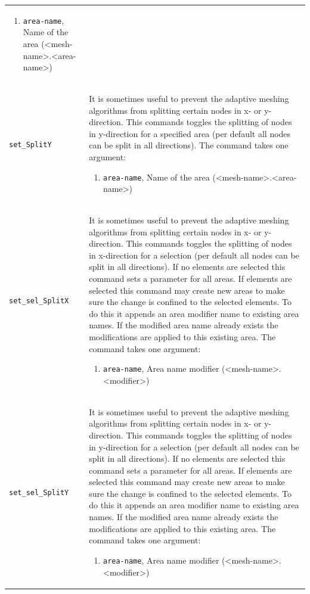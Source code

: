 \documentclass[noshowpacs,preprintnumbers,amsmath,amssymb, letter]{revtex4}
\begin{document}
\begin{longtable}{p{}p{}}
\begin{enumerate}
\item \texttt{area-name}, Name of the area (\textless mesh-name\textgreater .\textless area-name\textgreater )
\end{enumerate}\\
\texttt{set\_SplitY}	&  It is sometimes useful to prevent the adaptive meshing algorithms from splitting certain nodes in x- or y-direction. This commands toggles the splitting of nodes in y-direction for a specified area (per default all nodes can be split in all directions). The command takes one argument:
\begin{enumerate}
\item \texttt{area-name}, Name of the area (\textless mesh-name\textgreater .\textless area-name\textgreater )
\end{enumerate}\\
\texttt{set\_sel\_SplitX}	&  It is sometimes useful to prevent the adaptive meshing algorithms from splitting certain nodes in x- or y-direction. This commands toggles the splitting of nodes in x-direction for a selection (per default all nodes can be split in all directions). If no elements are selected this command sets a parameter for all areas. If elements are selected this command may create new areas to make sure the change is confined to the selected elements. To do this it appends an area modifier name to existing area names. If the modified area name already exists the modifications are applied to this existing area. The command takes one argument:
\begin{enumerate}
\item \texttt{area-name}, Area name modifier (\textless mesh-name\textgreater .\textless modifier\textgreater )
\end{enumerate}\\
\texttt{set\_sel\_SplitY}	&  It is sometimes useful to prevent the adaptive meshing algorithms from splitting certain nodes in x- or y-direction. This commands toggles the splitting of nodes in y-direction for a selection (per default all nodes can be split in all directions). If no elements are selected this command sets a parameter for all areas. If elements are selected this command may create new areas to make sure the change is confined to the selected elements. To do this it appends an area modifier name to existing area names. If the modified area name already exists the modifications are applied to this existing area. The command takes one argument:
\begin{enumerate}
\item \texttt{area-name}, Area name modifier (\textless mesh-name\textgreater .\textless modifier\textgreater )

\end{enumerate}
\end{longtable}
\end{document}
